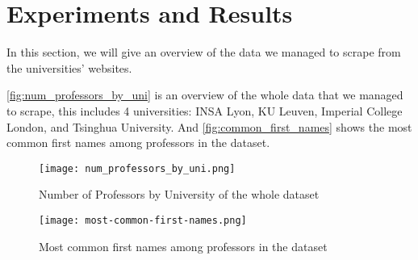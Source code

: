 \section{Experiments and Results}

In this section, we will give an overview of the data we managed to scrape from the universities' websites.

\autoref{fig:num_professors_by_uni} is an overview of the whole data that we managed to scrape, this includes 4 universities: INSA Lyon, KU Leuven, Imperial College London, and Tsinghua University. And \autoref{fig:common_first_names} shows the most common first names among professors in the dataset.

\begin{figure}[ht]
    \centering
    \texttt{[image: num\_professors\_by\_uni.png]}
    \caption{Number of Professors by University of the whole dataset}
    \label{fig:num_professors_by_uni}
\end{figure}

\begin{figure}[ht]
    \centering
    \texttt{[image: most-common-first-names.png]}
    \caption{Most common first names among professors in the dataset}
    \label{fig:common_first_names}
\end{figure}
